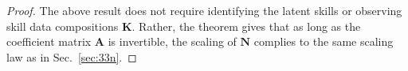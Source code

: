 \documentclass{article} %
\begin{document}
\begin{appendices}{}
\begin{proof}

The above result does not require identifying the latent skills or observing skill data compositions $\mathbf{K}$. Rather, the theorem gives that as long as the coefficient matrix $\mathbf{A}$ is invertible, the scaling of $\mathbf{N}$ complies to the same scaling law as in Sec.~\ref{sec:33n}.
\end{proof}







\end{appendices}
\end{document}
